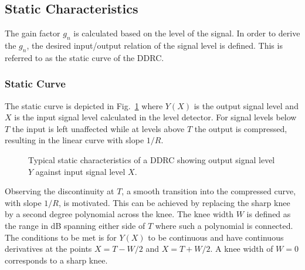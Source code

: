 \documentclass[../main2.tex]{subfiles}
\providecommand{\rootdir}{..}
\begin{document}
\FloatBarrier
\subsection{Static Characteristics}
The gain factor $g_n$ is calculated based on the level of the signal. In order to derive the $g_n$, the desired input/output relation of the signal level is defined. This is referred to as the static curve of the DDRC.

\subsubsection{Static Curve}
The static curve is depicted in Fig.~\ref{fig:typical_static_detailed} where $Y(X)$ is the output signal level and $X$ is the input signal level calculated in the level detector. For signal levels below $T$ the input is left unaffected while at levels above $T$ the output is compressed, resulting in the linear curve with slope $1/R$.  

\begin{figure}
\centerline{}
\caption{Typical static characteristics of a DDRC showing output signal level $Y$ against input signal level $X$.}
\label{fig:typical_static_detailed}
\end{figure}

Observing the discontinuity at $T$, a smooth transition into the compressed curve, with slope $1/R$, is motivated. This can be achieved by replacing the sharp knee by a second degree polynomial across the knee\cite{frindle1996implementation}\cite{reiss2012tutorial}. The knee width $W$ is defined as the range in dB spanning either side of $T$ where such a polynomial is connected. The conditions to be met is for $Y(X)$ to be continuous and have continuous derivatives at the points $X=T-W/2$ and $X=T+W/2$. A knee width of $W=0$ corresponds to a sharp knee. 
\end{document}
